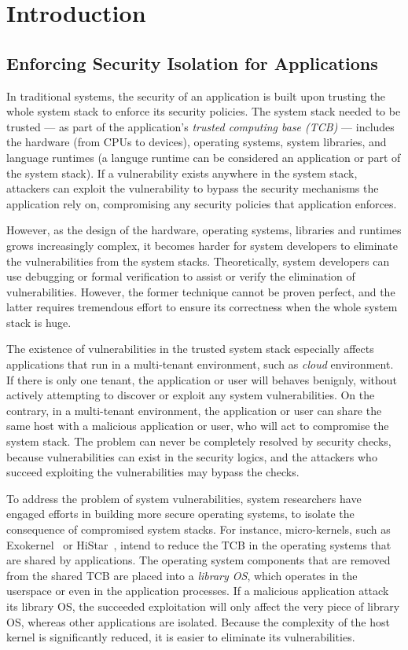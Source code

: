 \chapter{Introduction}
\label{chap:intro}

\section{Enforcing Security Isolation for Applications}
\label{sec:intro:isolation}

In traditional systems, the security of an application is built upon
trusting the whole system stack to enforce its security policies.
The system stack needed to be trusted
--- as part of the application's {\em trusted computing base (TCB)}
--- includes the hardware (from CPUs to devices), operating systems, system libraries, and language runtimes (a languge runtime can be considered an application or part of the system stack).
If a vulnerability exists anywhere in the system stack,
attackers can exploit the vulnerability to bypass the security mechanisms the application rely on,
compromising any security policies that application enforces.

However, as the design of the hardware, operating systems, libraries and runtimes grows increasingly complex,
it becomes harder for system developers to eliminate the vulnerabilities
from the system stacks.
Theoretically, system developers can use debugging or formal verification
to assist or verify the elimination of vulnerabilities.
However, the former technique cannot be proven perfect, and the latter requires tremendous effort to ensure its correctness
when the whole system stack is huge.

The existence of vulnerabilities in the trusted system stack especially affects applications that run in a multi-tenant environment, such as {\em cloud} environment.
If there is only one tenant,
the application or user will behaves benignly,
without actively attempting to discover or exploit any system vulnerabilities.
On the contrary, in a multi-tenant environment,
the application or user can share the same host with a malicious application or user,
who will act to compromise the system stack.
The problem can never be completely resolved by security checks,
because vulnerabilities can exist in the security logics,
and the attackers who succeed exploiting the vulnerabilities may bypass the checks.

To address the problem of system vulnerabilities, system researchers have engaged efforts in building more secure operating systems,
to isolate the consequence of compromised system stacks.
For instance,
micro-kernels, such as Exokernel~\citep{engler95exokernel} or HiStar~\citep{zeldovich+histar},
intend to reduce the TCB in the operating systems that are shared by applications.
The operating system components that are removed from the shared TCB are placed into a {\em library OS}, which operates in the userspace or even in the application processes.
If a malicious application attack its library OS,
the succeeded exploitation will only affect the very piece of library OS,
whereas other applications are isolated.
Because the complexity of the host kernel is significantly reduced,
it is easier to eliminate its vulnerabilities.

